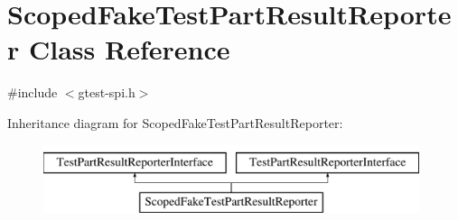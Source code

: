 \hypertarget{classtesting_1_1ScopedFakeTestPartResultReporter}{\section{\-Scoped\-Fake\-Test\-Part\-Result\-Reporter \-Class \-Reference}
\label{df/d0c/classtesting_1_1ScopedFakeTestPartResultReporter}
}


{\ttfamily \#include $<$gtest-\/spi.\-h$>$}

\-Inheritance diagram for \-Scoped\-Fake\-Test\-Part\-Result\-Reporter\-:\begin{figure}[H]
\begin{center}
\leavevmode
\includegraphics[height=2.000000cm]{df/d0c/classtesting_1_1ScopedFakeTestPartResultReporter}
\end{center}
\end{figure}
